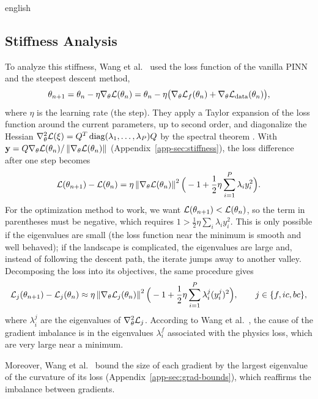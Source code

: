 \begin{hyphenrules}{english}
\subsection{Stiffness Analysis}

To analyze this stiffness, Wang et al.~\cite{wang2021gradient} used the loss function of the vanilla PINN and
the steepest descent method,
\begin{equation}
  \theta_{n+1}=\theta_n-\eta\nabla_\theta\mathcal{L}(\theta_n)=\theta_n-\eta\big(\nabla_\theta\mathcal{L}_f(\theta_n)+\nabla_\theta\mathcal{L}_{\mathrm{data}}(\theta_n)\big),
  \label{eq:gd}
\end{equation}
where $\eta$ is the learning rate (the step). They apply a Taylor expansion of the loss function around the current parameters, up to second order,
and diagonalize the Hessian $\nabla^2_\theta\mathcal{L}(\xi)=Q^{T}\operatorname{diag}(\lambda_1,\dots,\lambda_P)Q$ by the
spectral theorem \cite{trefethen1997}. With $\mathbf{y}=Q\nabla_\theta\mathcal{L}(\theta_n)/\left\lVert \nabla_\theta\mathcal{L}(\theta_n) \right\rVert$
(Appendix~\ref{app-sec:stiffness}), the loss difference after one step becomes
\begin{equation}
  \mathcal{L}(\theta_{n+1})-\mathcal{L}(\theta_n)=\eta\left\lVert \nabla_\theta\mathcal{L}(\theta_n) \right\rVert^2
  \Big(-1+\frac12\eta\sum_{i=1}^{P}\lambda_iy_i^2\Big).
  \label{eq:stiffness}
\end{equation}
For the optimization method to work, we want $\mathcal{L}(\theta_{n+1})<\mathcal{L}(\theta_n)$, so the term in
parentheses must be negative, which requires $1>\frac12\eta\sum_i\lambda_iy_i^2$. This is only possible if
the eigenvalues are small (the loss function near the minimum is smooth and well behaved); if the
landscape is complicated, the eigenvalues are large and, instead of following the descent path, the
iterate jumps away to another valley. Decomposing the loss into its objectives, the same procedure gives
\begin{equation}
  \mathcal{L}_j(\theta_{n+1})-\mathcal{L}_j(\theta_n)\approx\eta\left\lVert \nabla_\theta\mathcal{L}_j(\theta_n) \right\rVert^2
  \Big(-1+\frac12\eta\sum_{i=1}^{P}\lambda^{j}_i(y^{j}_i)^2\Big),\qquad j\in\{f,ic,bc\},
  \label{eq:stiffness-split}
\end{equation}
where $\lambda^{j}_i$ are the eigenvalues of $\nabla^2_\theta\mathcal{L}_j$. According to
Wang et al.~\cite{wang2021gradient}, the cause of the gradient imbalance is in the eigenvalues $\lambda^{f}_i$
associated with the physics loss, which are very large near a minimum.

Moreover, Wang et al.~\cite{wang2021gradient} bound the size of each gradient by the largest eigenvalue of
the curvature of its loss (Appendix~\ref{app-sec:grad-bounds}), which reaffirms the imbalance between
gradients.


\end{hyphenrules}
